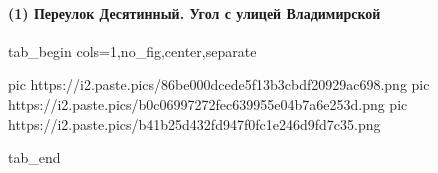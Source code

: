  
 
 
 
 

\paragraph{(1) Переулок Десятинный. Угол с улицей Владимирской}

\ifcmt
  tab_begin cols=1,no_fig,center,separate

     pic https://i2.paste.pics/86be000dcede5f13b3cbdf20929ac698.png
		 pic https://i2.paste.pics/b0c06997272fec639955e04b7a6e253d.png
		 pic https://i2.paste.pics/b41b25d432fd947f0fc1e246d9fd7c35.png

  tab_end
\fi
